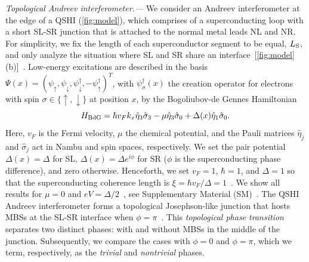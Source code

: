 \documentclass[aps,prl,amsmath,twocolumn,floatfix,superscriptaddress,longbibliography,footinbib]{revtex4-1}
\newcommand{\up}{\uparrow}
\newcommand{\dw}{\downarrow}
\begin{document}
\textit{Topological Andreev interferometer.---}
We consider an Andreev interferometer at the edge of a QSHI (\cref{fig:model}), which comprises of a superconducting loop with a short SL-SR junction that is attached to the normal metal leads NL and NR. 
For simplicity, we fix the length of each superconductor segment to be equal, $L_{\text S}$, and only analyze the situation where SL and SR share an interface~[\cref{fig:model}(b)]~\footnotemark[1]. Low-energy excitations are described in the basis $\Psi(x)=(
\psi_{\uparrow},
\psi_{\downarrow},
\psi_{\downarrow}^{\dagger},
-\psi_{\uparrow}^{\dagger})^{T}$, with $\psi^{\dagger}_{\sigma}(x)$ the creation operator for electrons with spin $\sigma\in\{\up,\dw\}$ at position $x$, by the Bogoliubov-de Gennes Hamiltonian~\cite{Cayao2017} 
\begin{equation}\label{Eq:BdG_H}
H_{\rm BdG}=\hbar v_{F}k_{x} \hat{\eta}_{3}\hat{\sigma}_{3}-\mu \hat{\eta}_{3}\hat{\sigma}_{0} + \Delta (x) \hat{\eta}_{1} \hat{\sigma}_{0} .
\end{equation}
Here, $v_{F}$ is the Fermi velocity, $\mu$ the chemical potential, and the Pauli matrices $\hat{\eta}_{j}$ and $\hat{\sigma}_{j}$ act in Nambu and spin spaces, respectively. 
We set the pair potential $\Delta(x)\!=\!\Delta$ for SL, $\Delta(x)\!=\!\Delta e^{i \phi}$ for SR ($\phi$ is the superconducting phase difference), and zero otherwise. 
Henceforth, we set $v_F\!=\!1$, $\hbar\!=\!1$, and $\Delta\!=\!1$ so that the superconducting coherence length is $\xi\!=\!\hbar v_F/\Delta\!=\!1$~\footnotemark[2].
We show all results for $\mu\!=\!0$ and $eV=\Delta/2$~\footnotemark[3],
see Supplementary Material (SM)~\cite{SM}. 
The QSHI Andreev interferometer forms a topological Josephson-like junction that hosts MBSs at the SL-SR interface when $\phi=\pi$~\cite{Fu2009,Cayao2022}. This \emph{topological phase transition} separates two distinct phases: with and without MBSs in the middle of the junction. Subsequently, we compare the cases with $\phi=0$ and $\phi=\pi$, which we term, respectively, as the \textit{trivial} and \textit{nontrivial} phases. 
\end{document}
